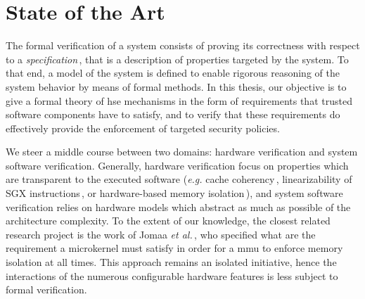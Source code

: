 \chapter{State of the Art}
\label{chapter:relatedwork}


%

\vspace{1cm}%
\noindent
%
The formal verification of a system consists of proving its correctness with
respect to a \emph{specification}\,\cite{gupta1992formal}, that is a description
of properties targeted by the system.
%
To that end, a model of the system is defined to enable rigorous reasoning of
the system behavior by means of formal methods.
%
%
In this thesis, our objective is to give a formal theory of \ac{hse} mechanisms
in the form of requirements that trusted software components have to satisfy,
and to verify that these requirements do effectively provide the enforcement of
targeted security policies.

We steer a middle course between two domains: hardware verification and system
software verification.
%
Generally, hardware verification focus on properties which are transparent to
the executed software (\emph{e.g.} cache
coherency\,\cite{stern1995cachecoherence}, linearizability of SGX
instructions\,\cite{leslie2015linsgx}, or hardware-based memory
isolation\,\cite{lie2003xom}), and system software verification relies on
hardware models which abstract as much as possible of the architecture
complexity.
%
To the extent of our knowledge, the closest related research project is the work
of Jomaa \emph{et al.}\,\cite{jomaa2016mmu}, who specified what are the
requirement a microkernel must satisfy in order for a \ac{mmu} to enforce memory
isolation at all times.
%
This approach remains an isolated initiative, hence the interactions of the
numerous configurable hardware features is less subject to formal verification.

